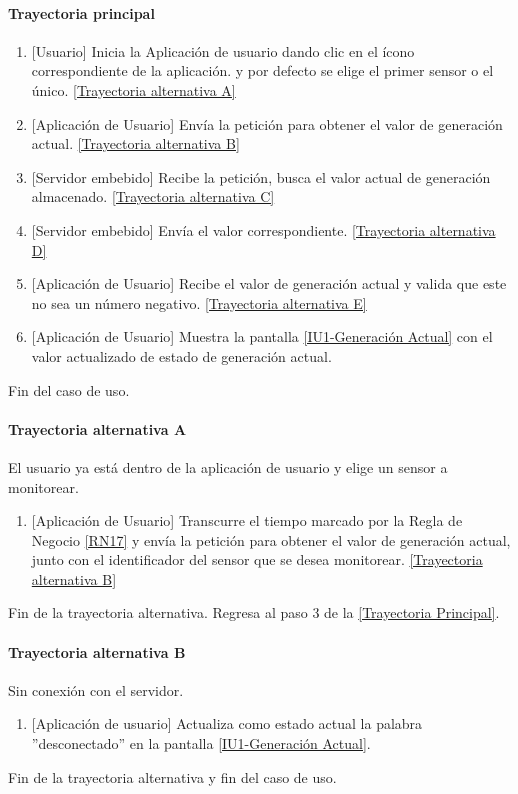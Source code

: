 \paragraph{Trayectoria principal}
    \label{SUB-U-CU1.1:TP}
	\begin{enumerate}
	    \item {[Usuario]} Inicia la Aplicación de usuario dando clic en el ícono correspondiente de la aplicación. y por defecto se elige el primer sensor o el único. \hyperref[SUB-U-CU1.1:TA]{[Trayectoria alternativa A]}
	    \item {[Aplicación de Usuario]} Envía la petición para obtener el valor de generación actual. \hyperref[SUB-U-CU1.1:TB]{[Trayectoria alternativa B]} 
	    \item {[Servidor embebido]} Recibe la petición, busca el valor actual de generación almacenado. \hyperref[SUB-U-CU1.1:TC]{[Trayectoria alternativa C]}
	    \item {[Servidor embebido]} Envía el valor correspondiente. \hyperref[SUB-U-CU1.1:TD]{[Trayectoria alternativa D]} 
	    \item {[Aplicación de Usuario]} Recibe el valor de generación actual y valida que este no sea un número negativo. \hyperref[SUB-U-CU1.1:TE]{[Trayectoria alternativa E]} 
	    \item {[Aplicación de Usuario]} Muestra la pantalla \hyperref[fig:monitoreo]{[IU1-Generación Actual]} con el valor actualizado de estado de generación actual.
	\end{enumerate}
	Fin del caso de uso.

\paragraph{Trayectoria alternativa A} \label{SUB-U-CU1.1:TA}
	El usuario ya está dentro de la aplicación de usuario y elige un sensor a monitorear.
	\begin{enumerate}[label=A\arabic*.]
		\item {[Aplicación de Usuario]} Transcurre el tiempo marcado por la Regla de Negocio \ref{RN17} y envía la petición para obtener el valor de generación actual, junto con el identificador del sensor que se desea monitorear. \hyperref[SUB-U-CU1.1:TB]{[Trayectoria alternativa B]} 
	\end{enumerate}
	Fin de la trayectoria alternativa. Regresa al paso 3 de la \hyperref[SUB-U-CU1.1:TP]{[Trayectoria Principal]}.

\paragraph{Trayectoria alternativa B} \label{SUB-U-CU1.1:TB}
	Sin conexión con el servidor.
	\begin{enumerate}[label=B\arabic*.]
		\item {[Aplicación de usuario]} Actualiza como estado actual la palabra ''desconectado'' en la pantalla \hyperref[fig:monitoreo]{[IU1-Generación Actual]}.
	\end{enumerate}
	Fin de la trayectoria alternativa y fin del caso de uso.

